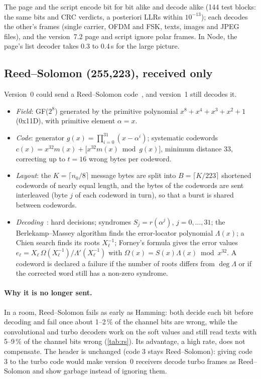 \documentclass[11pt,a4paper]{article}
\newcommand{\nz}{n_{0}}
\theoremstyle{remark}
\begin{document}
The page and the script encode bit for bit alike and decode alike (144 test blocks: the same bits and CRC verdicts, a posteriori LLRs within $10^{-13}$); each decodes the other's frames (single carrier, OFDM and FSK, texts, images and JPEG files), and the version~7.2 page and script ignore polar frames. In Node, the page's list decoder takes 0.3 to 0.4\,s for the large picture.

\subsection{Reed--Solomon (255,223), received only}
\label{sec:rs}
Version~0 could send a Reed--Solomon code~\cite{reedsolomon}, and version~1 still decodes it.
\begin{itemize}
\item \emph{Field}: GF($2^8$) generated by the primitive polynomial $x^8 + x^4 + x^3 + x^2 + 1$ (0x11D), with primitive element $\alpha = x$.
\item \emph{Code}: generator $g(x) = \prod_{i=0}^{31} (x - \alpha^i)$; systematic codewords $c(x) = x^{32} m(x) + \bigl[x^{32} m(x) \bmod g(x)\bigr]$, minimum distance 33, correcting up to $t = 16$ wrong bytes per codeword.
\item \emph{Layout}: the $K = \lceil \nz/8 \rceil$ message bytes are split into $B = \lceil K/223 \rceil$ shortened codewords of nearly equal length, and the bytes of the codewords are sent interleaved (byte $j$ of each codeword in turn), so that a burst is shared between codewords.
\item \emph{Decoding}~\cite{berlekamp,massey,chien,forneybch}: hard decisions; syndromes $S_j = r(\alpha^j)$, $j = 0, \dots, 31$; the Berlekamp--Massey algorithm finds the error-locator polynomial $\Lambda(x)$; a Chien search finds its roots $X_\ell^{-1}$; Forney's formula gives the error values $e_\ell = X_\ell\, \Omega(X_\ell^{-1}) / \Lambda'(X_\ell^{-1})$ with $\Omega(x) = S(x)\Lambda(x) \bmod x^{32}$. A codeword is declared a failure if the number of roots differs from $\deg \Lambda$ or if the corrected word still has a non-zero syndrome.
\end{itemize}
\paragraph{Why it is no longer sent.}
In a room, Reed--Solomon fails as early as Hamming: both decide each bit before decoding and fail once about 1--2\,\% of the channel bits are wrong, while the convolutional and turbo decoders work on the soft values and still read texts with 5--9\,\% of the channel bits wrong (\cref{tab:rs}). Its advantage, a high rate, does not compensate. The header is unchanged (code 3 stays Reed--Solomon): giving code 3 to the turbo code would make version~0 receivers decode turbo frames as Reed--Solomon and show garbage instead of ignoring them.
\end{document}
